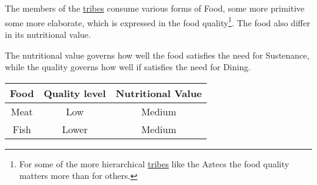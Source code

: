 \section{}\label{ch:Goods:Food}

The members of the \hyperref[ch:Tribes]{tribes} consume various forms of
\gls*{Food}, some more primitive some more elaborate, which is expressed in the
food quality\footnote{ For some of the more hierarchical
	\hyperref[ch:Tribes]{tribes} like the \gls{Aztecs} the food quality matters more
	than for others. }. The food also differ in its nutritional value.

The nutritional value governs how well the food satisfies the need for \gls{Sustenance},
while the quality governs how well if satisfies the need for \gls{Dining}.


\begin{longtable}{ccc}
	\toprule
	\Gls*{Food} & Quality level & Nutritional Value \\
	\midrule
	\Gls{Meat}  & Low           & Medium            \\
	\Gls{Fish}  & Lower         & Medium            \\
	\bottomrule
\end{longtable}
